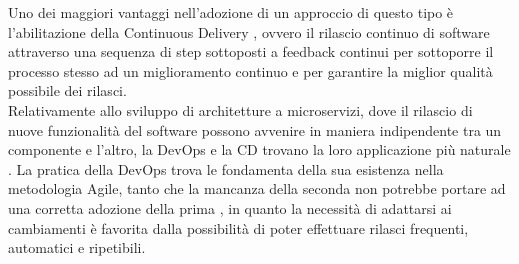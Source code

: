 \documentclass[a4paper, 12pt]{report}
\numberwithin{equation}{section}
\begin{document}
Uno dei maggiori vantaggi nell’adozione di un approccio di questo tipo è l’abilitazione della Continuous Delivery \cite{chen-devops}, ovvero il rilascio continuo di software attraverso una sequenza di step sottoposti a feedback continui per sottoporre il processo stesso ad un miglioramento continuo e per garantire la miglior qualità possibile dei rilasci.\\
Relativamente allo sviluppo di architetture a microservizi, dove il rilascio di nuove funzionalità del software possono avvenire in maniera indipendente tra un componente e l’altro, la DevOps e la CD trovano la loro applicazione più naturale \cite{balalaie-devops}.
La pratica della DevOps trova le fondamenta della sua esistenza nella metodologia Agile, tanto che la mancanza della seconda non potrebbe portare ad una corretta adozione della prima \cite{lwakatare-devops}, in quanto la necessità di adattarsi ai cambiamenti è favorita dalla possibilità di poter effettuare rilasci frequenti, automatici e ripetibili.
\end{document}
